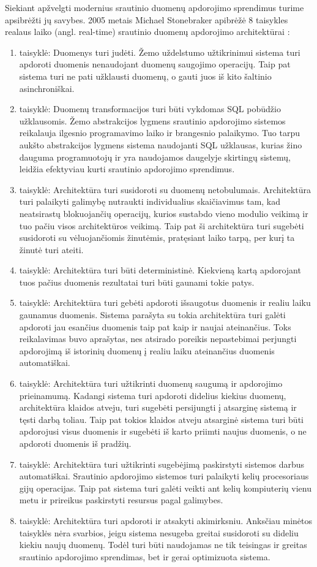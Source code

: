 \documentclass{VUMIFPSbakalaurinis}
\begin{document}
Siekiant apžvelgti modernius srautinio duomenų apdorojimo sprendimus turime apsibrėžti jų savybes.
2005 metais Michael Stonebraker apibrėžė 8 taisykles realaus laiko (angl. real-time) srautinio duomenų apdorojimo architektūrai \cite{stonebraker20058}:
\begin{enumerate}[label=\arabic*]
    \item taisyklė: Duomenys turi judėti. Žemo uždelstumo užtikrinimui sistema turi apdoroti duomenis nenaudojant duomenų saugojimo operacijų. 
    Taip pat sistema turi ne pati užklausti duomenų, o gauti juos iš kito šaltinio asinchroniškai. 
    \item taisyklė: Duomenų transformacijos turi būti vykdomas SQL pobūdžio užklausomis. Žemo abstrakcijos lygmens srautinio apdorojimo sistemos reikalauja ilgesnio programavimo laiko ir brangesnio palaikymo. Tuo tarpu aukšto abstrakcijos lygmens sistema naudojanti SQL užklausas, kurias žino dauguma programuotojų ir yra naudojamos daugelyje skirtingų sistemų, leidžia efektyviau kurti srautinio apdorojimo sprendimus.
    \item taisyklė: Architektūra turi susidoroti su duomenų netobulumais. Architektūra turi palaikyti galimybę nutraukti individualius skaičiavimus tam, kad neatsirastų blokuojančių operacijų, kurios sustabdo vieno modulio veikimą ir tuo pačiu visos architektūros veikimą. Taip pat ši architektūra turi sugebėti susidoroti su vėluojančiomis žinutėmis, pratęsiant laiko tarpą, per kurį ta žinutė turi ateiti.
    \item taisyklė: Architektūra turi būti deterministinė. Kiekvieną kartą apdorojant tuos pačius duomenis rezultatai turi būti gaunami tokie patys.
    \item taisyklė: Architektūra turi gebėti apdoroti išsaugotus duomenis ir realiu laiku gaunamus duomenis. Sistema parašyta su tokia architektūra turi galėti apdoroti jau esančius duomenis taip pat kaip ir naujai ateinančius. Toks reikalavimas buvo aprašytas, nes atsirado poreikis nepastebimai perjungti apdorojimą iš istorinių duomenų į realiu laiku ateinančius duomenis automatiškai.
    \item taisyklė: Architektūra turi užtikrinti duomenų saugumą ir apdorojimo prieinamumą. Kadangi sistema turi apdoroti didelius kiekius duomenų, architektūra klaidos atveju, turi sugebėti persijungti į atsarginę sistemą ir tęsti darbą toliau. Taip pat tokios klaidos atveju atsarginė sistema turi būti apdorojusi visus duomenis ir sugebėti iš karto priimti naujus duomenis, o ne apdoroti duomenis iš pradžių.
    \item taisyklė: Architektūra turi užtikrinti sugebėjimą paskirstyti sistemos darbus automatiškai. Srautinio apdorojimo sistemos turi palaikyti kelių procesoriaus gijų operacijas. Taip pat sistema turi galėti veikti ant kelių kompiuterių vienu metu ir prireikus paskirstyti resursus pagal galimybes.
    \item taisyklė: Architektūra turi apdoroti ir atsakyti akimirksniu. Anksčiau minėtos taisyklės nėra svarbios, jeigu sistema nesugeba greitai susidoroti su dideliu kiekiu naujų duomenų. Todėl turi būti naudojamas ne tik teisingas ir greitas srautinio apdorojimo sprendimas, bet ir gerai optimizuota sistema.
\end{enumerate}\par 
\end{document}

